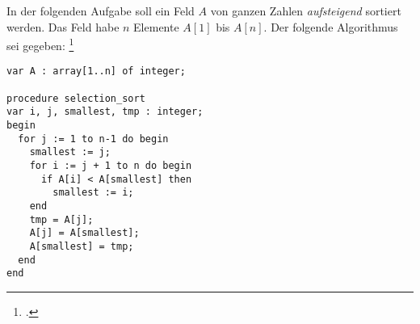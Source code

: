 \documentclass{bschlangaul-aufgabe}
\begin{document}

In der folgenden Aufgabe soll ein Feld $A$ von ganzen Zahlen
\emph{aufsteigend} sortiert werden. Das Feld habe $n$ Elemente $A[1]$
bis $A[n]$. Der folgende Algorithmus sei gegeben:
\footcite{examen:46115:2019:09}

\begin{verbatim}
var A : array[1..n] of integer;

procedure selection_sort
var i, j, smallest, tmp : integer;
begin
  for j := 1 to n-1 do begin
    smallest := j;
    for i := j + 1 to n do begin
      if A[i] < A[smallest] then
        smallest := i;
    end
    tmp = A[j];
    A[j] = A[smallest];
    A[smallest] = tmp;
  end
end
\end{verbatim}
\end{document}
